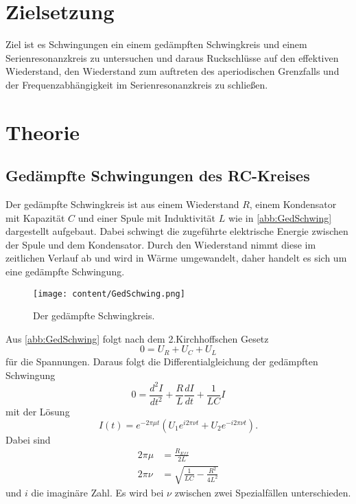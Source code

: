 \section{Zielsetzung}
\label{sec:Zielsetzung}
Ziel ist es Schwingungen ein einem gedämpften Schwingkreis und einem Serienresonanzkreis zu untersuchen und daraus
Ruckschlüsse auf den effektiven Wiederstand, den Wiederstand zum auftreten des aperiodischen Grenzfalls und der Frequenzabhängigkeit
im Serienresonanzkreis zu schließen.
\section{Theorie}
\label{sec:Theorie}
\subsection{Gedämpfte Schwingungen des RC-Kreises}
Der gedämpfte Schwingkreis ist aus einem Wiederstand $R$, einem Kondensator mit Kapazität $C$ und
einer Spule mit Induktivität $L$ wie in \autoref{abb:GedSchwing} dargestellt aufgebaut. Dabei schwingt
die zugeführte elektrische Energie zwischen der Spule und dem Kondensator. Durch den Wiederstand nimmt diese im zeitlichen
Verlauf ab und wird in Wärme umgewandelt, daher handelt es sich um eine gedämpfte Schwingung.
\begin{figure}[H]
    \centering
    \texttt{[image: content/GedSchwing.png]}
    \caption{Der gedämpfte Schwingkreis. \cite{sample}}
    \label{abb:GedSchwing}
\end{figure}
\noindent Aus \autoref{abb:GedSchwing} folgt nach dem 2.Kirchhoffschen Gesetz
\begin{equation*}
    0 = U_R + U_C + U_L
\end{equation*}
für die Spannungen.
Daraus folgt die Differentialgleichung der gedämpften Schwingung
\begin{equation*}
    0 = \frac{d^2 I}{dt^2} + \frac{R}{L}\frac{dI}{dt} + \frac{1}{LC}I
\end{equation*}
mit der Lösung
\begin{equation}
    \label{eqn:AllgLoes}
    I(t) = e^{-2\pi\mu t}\left(U_1e^{i2\pi\nu t} + U_2e^{-i2\pi\nu t}\right).
\end{equation}
Dabei sind
\begin{align}
   2\pi\mu &= \frac{R_{Eff}}{2L}\\
   2\pi\nu &= \sqrt{\frac{1}{LC} - \frac{R^2}{4L^2}}
\end{align}
und $i$ die imaginäre Zahl.
Es wird bei $\nu$ zwischen zwei Spezialfällen unterschieden.\\
